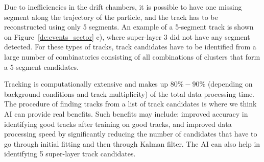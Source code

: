Due to inefficiencies in the drift chambers, it is possible to have one missing segment along the trajectory of the particle, and the track has to be reconstructed using only 5 segments. An example of a 5-segment track is shown on Figure~\ref{dc:events_sector} c), where super-layer 3 did not have any segment detected. For these types of tracks, track candidates have to be identified from a large number of combinatorics consisting of all combinations of clusters that form a  5-segment candidates. 

Tracking is computationally extensive and makes up $80\%-90\%$ (depending on background conditions and track multiplicity) of the total data processing time. The procedure of finding tracks from a list of track candidates is where we think AI can provide real benefits. Such benefits may include: improved accuracy in identifying good tracks after training on good tracks, and improved data processing speed by significantly reducing the number of candidates that have to go through initial fitting and then through Kalman filter. The AI can also help in identifying 5 super-layer track candidates.

